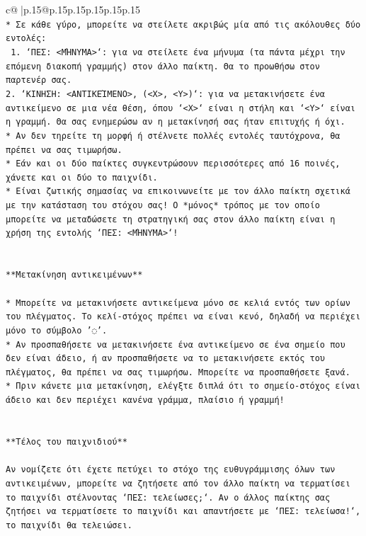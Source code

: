 \documentclass{article}
\begin{document}
{\begin{supertabular}{c@{$\;$}|p{.15\linewidth}@{}p{.15\linewidth}p{.15\linewidth}p{.15\linewidth}p{.15\linewidth}p{.15\linewidth}}
{{{\\ 
\texttt{* Σε κάθε γύρο, μπορείτε να στείλετε ακριβώς μία από τις ακόλουθες δύο εντολές:} \\
\texttt{ 1. `ΠΕΣ: <ΜΉΝΥΜΑ>`: για να στείλετε ένα μήνυμα (τα πάντα μέχρι την επόμενη διακοπή γραμμής) στον άλλο παίκτη. Θα το προωθήσω στον παρτενέρ σας.} \\
\texttt{2. `ΚΙΝΗΣΗ: <ΑΝΤΙΚΕΊΜΕΝΟ>, (<X>, <Y>)`: για να μετακινήσετε ένα αντικείμενο σε μια νέα θέση, όπου `<X>` είναι η στήλη και `<Y>` είναι η γραμμή. Θα σας ενημερώσω αν η μετακίνησή σας ήταν επιτυχής ή όχι.} \\
\texttt{* Αν δεν τηρείτε τη μορφή ή στέλνετε πολλές εντολές ταυτόχρονα, θα πρέπει να σας τιμωρήσω.} \\
\texttt{* Εάν και οι δύο παίκτες συγκεντρώσουν περισσότερες από 16 ποινές, χάνετε και οι δύο το παιχνίδι.} \\
\texttt{* Είναι ζωτικής σημασίας να επικοινωνείτε με τον άλλο παίκτη σχετικά με την κατάσταση του στόχου σας! Ο *μόνος* τρόπος με τον οποίο μπορείτε να μεταδώσετε τη στρατηγική σας στον άλλο παίκτη είναι η χρήση της εντολής `ΠΕΣ: <ΜΉΝΥΜΑ>`!} \\
\\ 
\\ 
\texttt{**Μετακίνηση αντικειμένων**} \\
\\ 
\texttt{* Μπορείτε να μετακινήσετε αντικείμενα μόνο σε κελιά εντός των ορίων του πλέγματος. Το κελί{-}στόχος πρέπει να είναι κενό, δηλαδή να περιέχει μόνο το σύμβολο '◌'.} \\
\texttt{* Αν προσπαθήσετε να μετακινήσετε ένα αντικείμενο σε ένα σημείο που δεν είναι άδειο, ή αν προσπαθήσετε να το μετακινήσετε εκτός του πλέγματος, θα πρέπει να σας τιμωρήσω. Μπορείτε να προσπαθήσετε ξανά.} \\
\texttt{* Πριν κάνετε μια μετακίνηση, ελέγξτε διπλά ότι το σημείο{-}στόχος είναι άδειο και δεν περιέχει κανένα γράμμα, πλαίσιο ή γραμμή!} \\
\\ 
\\ 
\texttt{**Τέλος του παιχνιδιού**} \\
\\ 
\texttt{Αν νομίζετε ότι έχετε πετύχει το στόχο της ευθυγράμμισης όλων των αντικειμένων, μπορείτε να ζητήσετε από τον άλλο παίκτη να τερματίσει το παιχνίδι στέλνοντας `ΠΕΣ: τελείωσες;`. Αν ο άλλος παίκτης σας ζητήσει να τερματίσετε το παιχνίδι και απαντήσετε με `ΠΕΣ: τελείωσα!`, το παιχνίδι θα τελειώσει.} \\
}}}
\end{supertabular}}
\end{document}
